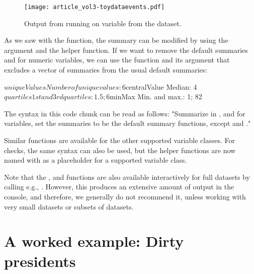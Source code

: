 \documentclass[article,shortnames]{jss}
\begin{document}
\begin{figure}[tb]
\begin{center}
\texttt{[image: article\_vol3-toydataevents.pdf]}
\end{center}
\caption{Output from running  on variable  from the
 dataset.}
\label{fig:example3}
\end{figure}


As we saw with the  function, the summary can be modified
by using the  argument and the  helper function. If we want to remove the default summaries  and  for numeric variables, we can use the function  and its argument  that excludes a vector of summaries from the usual default summaries:


\begin{Schunk}
\begin{Soutput}
$uniqueValues
Number of unique values: 6
$centralValue
Median: 4
$quartiles
1st and 3rd quartiles: 1.5; 6
$minMax
Min. and max.: 1; 82
\end{Soutput}
\end{Schunk}

The syntax in this code chunk can be read as follows: "Summarize  in , and for  variables, set the summaries to be the default summary functions, except  and ." 

Similar  functions are available for the other supported variable classes. For checks, the same syntax can also be used, but the helper functions are now named  with  as a placeholder for a supported variable class.

Note that the ,  and  functions are also available interactively for full datasets by calling e.g., . However, this produces an extensive amount of output in the console, and therefore, we generally do not recommend it, unless working with very small datasets or subsets of datasets.

\section{A worked example: Dirty presidents} 
\label{sec:bigExample}
\end{document}
